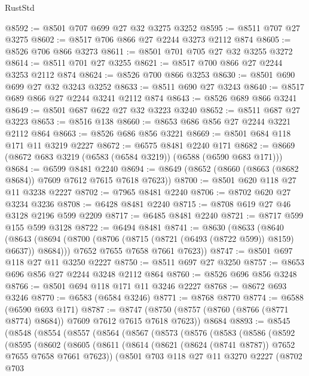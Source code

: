 \begin{lexlean}{RustStd}
\begin{coremodule}
@8592 := @8501 @707 @699 @27 @32 @3275 @3252
@8595 := @8511 @707 @27 @3275
@8602 := @8517 @706 @866 @27 @2244 @3273 @2112 @874
@8605 := @8526 @706 @866 @3273
@8611 := @8501 @701 @705 @27 @32 @3255 @3272
@8614 := @8511 @701 @27 @3255
@8621 := @8517 @700 @866 @27 @2244 @3253 @2112 @874
@8624 := @8526 @700 @866 @3253
@8630 := @8501 @690 @699 @27 @32 @3243 @3252
@8633 := @8511 @690 @27 @3243
@8640 := @8517 @689 @866 @27 @2244 @3241 @2112 @874
@8643 := @8526 @689 @866 @3241
@8649 := @8501 @687 @622 @27 @32 @3223 @3240
@8652 := @8511 @687 @27 @3223
@8653 := @8516 @138
@8660 := @8653 @686 @856 @27 @2244 @3221 @2112 @864
@8663 := @8526 @686 @856 @3221
@8669 := @8501 @684 @118 @171 @11 @3219 @2227
@8672 := @6575 @8481 @2240 @171
@8682 := @8669 (@8672 @683 @3219 (@6583 (@6584 @3219)) (@6588 (@6590 @683 @171)))
@8684 := @6599 @8481 @2240
@8694 := @8649 (@8652 (@8660 (@8663 (@8682 @8684)) @7609 @7612 @7615 @7618 @7623))
@8700 := @8501 @620 @118 @27 @11 @3238 @2227
@8702 := @7965 @8481 @2240
@8706 := @8702 @620 @27 @3234 @3236
@8708 := @6428 @8481 @2240
@8715 := @8708 @619 @27 @46 @3128 @2196 @599 @2209
@8717 := @6485 @8481 @2240
@8721 := @8717 @599 @155 @599 @3128
@8722 := @6494 @8481
@8741 := @8630
    (@8633
      (@8640
        (@8643 (@8694 (@8700 (@8706 (@8715 (@8721 (@6493 (@8722 @599)) @8159) @6637)) @8684)))
        @7652
        @7655
        @7658
        @7661
        @7623))
@8747 := @8501 @697 @118 @27 @11 @3250 @2227
@8750 := @8511 @697 @27 @3250
@8757 := @8653 @696 @856 @27 @2244 @3248 @2112 @864
@8760 := @8526 @696 @856 @3248
@8766 := @8501 @694 @118 @171 @11 @3246 @2227
@8768 := @8672 @693 @3246
@8770 := @6583 (@6584 @3246)
@8771 := @8768 @8770
@8774 := @6588 (@6590 @693 @171)
@8787 := @8747
    (@8750 (@8757 (@8760 (@8766 (@8771 @8774) @8684)) @7609 @7612 @7615 @7618 @7623))
    @8684
@8893 := @8545
    (@8548
      (@8554
        (@8557
          (@8564
            (@8567
              (@8573
                (@8576
                  (@8583
                    (@8586
                      (@8592
                        (@8595
                          (@8602
                            (@8605
                              (@8611
                                (@8614 (@8621 (@8624 (@8741 @8787)) @7652 @7655 @7658 @7661 @7623))
                                (@8501
                                  @703
                                  @118
                                  @27
                                  @11
                                  @3270
                                  @2227
                                  (@8702
                                    @703

\end{coremodule}
\end{lexlean}
